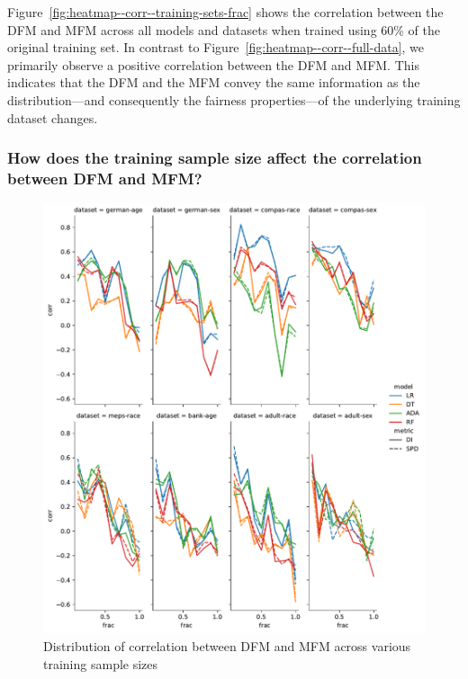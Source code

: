 \documentclass{article}
\begin{document}
Figure \ref{fig:heatmap--corr--training-sets-frac} shows the
correlation between the DFM and MFM across all models and datasets
when trained using 60\% of the original training set. In contrast to
Figure \ref{fig:heatmap--corr--full-data}, we primarily observe
a positive correlation between the DFM and MFM. This indicates that
the DFM and the MFM convey the same information as the
distribution---and consequently the fairness properties---of the
underlying training dataset changes.

\subsubsection{How does the training sample size affect the correlation between DFM and MFM?}\label{sec:results-corr-frac}

\begin{figure}
  \centering
  \includegraphics[width=0.95\linewidth]{lineplot--frac--corr.pdf}
  \caption{Distribution of correlation between DFM and MFM across
    various training sample sizes}
  \label{fig:lineplot--frac--corr}
\end{figure}
\end{document}
